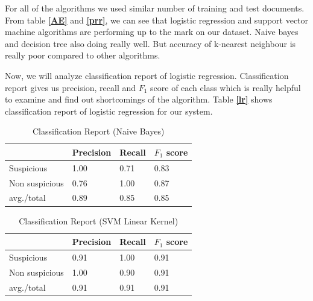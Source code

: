 For all of the algorithms we used similar number of training and test documents. From table \textbf{\ref{AE}} and \textbf{\ref{prr}}, we can see that logistic regression and support vector machine algorithms are performing up to the mark on our dataset. Naive bayes and decision tree also doing really well. But accuracy of k-nearest neighbour is really poor compared to other algorithms.\par
\vspace{0.2cm}

Now, we will analyze classification report of logistic regression. Classification report gives us precision, recall and $F_1$ score of each class which is really helpful to examine and find out shortcomings of the algorithm.
Table \textbf{\ref{lr}}  shows classification report of logistic regression for our system. 

\iffalse
\renewcommand{\arraystretch}{1.1}
\begin{table}[h!]
\begin{center}
\caption{Classification Report (Naive Bayes)}
\begin{tabular}{|m{2.8cm} | m{1.5cm}| m{1.3cm}| m{1.5cm}|}
\hline
     & Precision & Recall & $F_1$ score\\
\hline
     Suspicious & 1.00 & 0.71 & 0.83\\
\hline 
     Non suspicious  & 0.76 & 1.00 & 0.87\\
\hline 
     avg./total & 0.89 & 0.85 & 0.85\\
\hline
\end{tabular}
\label{NBC}
\end{center}
\end{table}

\begin{table}[h!]
\begin{center}
\caption{Classification Report (SVM Linear Kernel)}
\begin{tabular}{|m{2.8cm} | m{1.5cm}| m{1.3cm}| m{1.5cm}|}
\hline
     & Precision & Recall & $F_1$ score\\
\hline
     Suspicious & 0.91 & 1.00 & 0.91\\
\hline 
     Non suspicious  & 1.00 & 0.90 & 0.91\\
\hline 
     avg./total & 0.91 & 0.91 & 0.91\\
\hline
\end{tabular}
\label{SVML}
\end{center}
\end{table}

